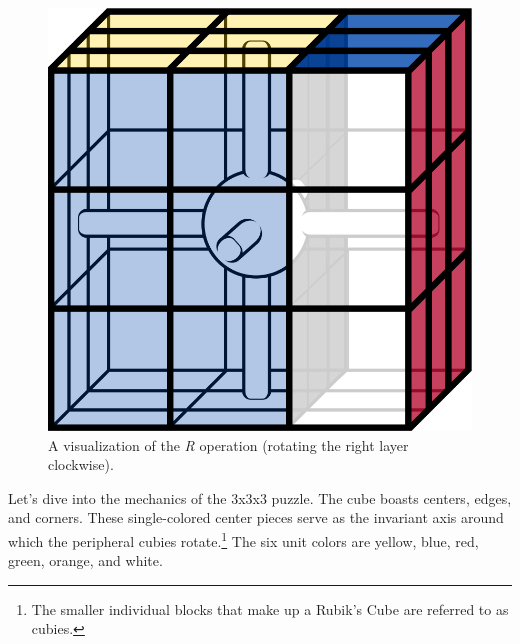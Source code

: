 \documentclass[12pt]{article}
\begin{document}
\begin{figure}[h]
\begin{minipage}[c]{0.2\textwidth}
    \end{minipage}
    \begin{minipage}[c]{0.2\textwidth}
        \includegraphics[scale=0.1]{moves/core_r_transform.png}
    \end{minipage}
    \caption{A visualization of the \textit{R} operation (rotating the right layer clockwise).}
\end{figure}

Let's dive into the mechanics of the 3x3x3 puzzle. The cube boasts centers, edges, and corners. These single-colored center pieces serve as the invariant axis around which the peripheral cubies rotate.\footnote{The smaller individual blocks that make up a Rubik's Cube are referred to as cubies.} The six unit colors are yellow, blue, red, green, orange, and white.
\end{document}
